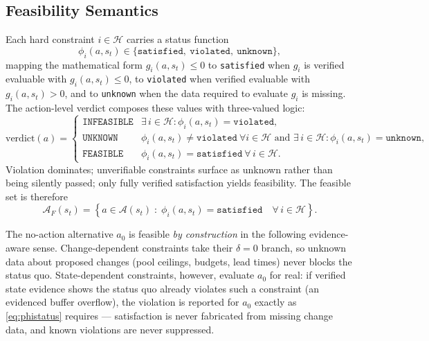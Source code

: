 \documentclass[11pt,a4paper]{article}
\newcommand{\Acal}{\mathcal{A}}
\newcommand{\Hcal}{\mathcal{H}}
\begin{document}
\subsection{Feasibility Semantics}\label{sec:hardsoft}

Each hard constraint $i \in \Hcal$ carries a status function
\begin{equation}\label{eq:phistatus}
\phi_i(a, s_t) \in \{\texttt{satisfied},\ \texttt{violated},\ \texttt{unknown}\},
\end{equation}
mapping the mathematical form $g_i(a,s_t) \le 0$ to \texttt{satisfied} when
$g_i$ is verified evaluable with $g_i(a,s_t) \le 0$, to \texttt{violated} when
verified evaluable with $g_i(a,s_t) > 0$, and to \texttt{unknown} when the
data required to evaluate $g_i$ is missing. The action-level verdict composes
these values with three-valued logic:
\begin{equation}\label{eq:verdict}
\text{verdict}(a)
=
\begin{cases}
\texttt{INFEASIBLE} & \exists\, i \in \Hcal : \phi_i(a,s_t) = \texttt{violated},\\[2pt]
\texttt{UNKNOWN} & \phi_i(a,s_t) \ne \texttt{violated}\ \forall i \in \Hcal
\text{ and } \exists\, i \in \Hcal : \phi_i(a,s_t) = \texttt{unknown},\\[2pt]
\texttt{FEASIBLE} & \phi_i(a,s_t) = \texttt{satisfied}\ \forall\, i \in \Hcal.
\end{cases}
\end{equation}
Violation dominates; unverifiable constraints surface as unknown rather than
being silently passed; only fully verified satisfaction yields feasibility.
The feasible set is therefore
\begin{equation}\label{eq:feasibleset}
\Acal_F(s_t)
=
\left\{
a \in \Acal(s_t)
\;:\;
\phi_i(a, s_t) = \texttt{satisfied} \quad \forall\, i \in \Hcal
\right\}.
\end{equation}

The no-action alternative $a_0$ is feasible \emph{by construction} in the
following evidence-aware sense. Change-dependent constraints take their
$\delta = 0$ branch, so unknown data about proposed changes (pool ceilings,
budgets, lead times) never blocks the status quo. State-dependent
constraints, however, evaluate $a_0$ for real: if verified state evidence
shows the status quo already violates such a constraint (an evidenced buffer
overflow), the violation is reported for $a_0$ exactly as
\cref{eq:phistatus} requires --- satisfaction is never fabricated from
missing change data, and known violations are never suppressed.
\end{document}
